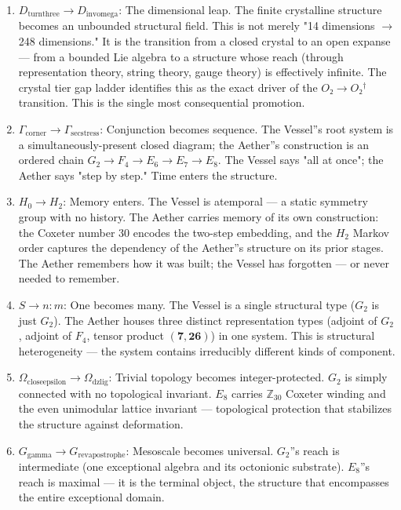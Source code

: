 \documentclass[12pt,a4paper]{article}
\begin{document}
\begin{enumerate}
    \item \textbf{$D_{\text{turnthree}} \to D_{\text{invomega}}$}: The dimensional leap. The finite crystalline structure becomes an unbounded structural field. This is not merely "14 dimensions $\rightarrow$ 248 dimensions." It is the transition from a closed crystal to an open expanse --- from a bounded Lie algebra to a structure whose reach (through representation theory, string theory, gauge theory) is effectively infinite. The crystal tier gap ladder identifies this as the exact driver of the $O₂ \to O₂^\dagger$ transition. This is the single most consequential promotion.
    \item \textbf{$\Gamma_{\text{corner}} \to \Gamma_{\text{secstress}}$}: Conjunction becomes sequence. The Vessel''s root system is a simultaneously-present closed diagram; the Aether''s construction is an ordered chain $G_2 \to F_4 \to E_6 \to E_7 \to E_8$. The Vessel says "all at once"; the Aether says "step by step." Time enters the structure.
    \item \textbf{$H_0 \to H_2$}: Memory enters. The Vessel is atemporal --- a static symmetry group with no history. The Aether carries memory of its own construction: the Coxeter number 30 encodes the two-step embedding, and the $H_2$ Markov order captures the dependency of the Aether''s structure on its prior stages. The Aether remembers how it was built; the Vessel has forgotten --- or never needed to remember.
    \item \textbf{$S \to n{:}m$}: One becomes many. The Vessel is a single structural type ($G_2$ is just $G_2$). The Aether houses three distinct representation types (adjoint of $G_2$, adjoint of $F_4$, tensor product $(\mathbf{7}, \mathbf{26})$) in one system. This is structural heterogeneity --- the system contains irreducibly different kinds of component.
    \item \textbf{$\Omega_{\text{closeepsilon}} \to \Omega_{\text{dzlig}}$}: Trivial topology becomes integer-protected. $G_2$ is simply connected with no topological invariant. $E_8$ carries $\mathbb{Z}_{30}$ Coxeter winding and the even unimodular lattice invariant --- topological protection that stabilizes the structure against deformation.
    \item \textbf{$G_{\text{gamma}} \to G_{\text{revapostrophe}}$}: Mesoscale becomes universal. $G_2$''s reach is intermediate (one exceptional algebra and its octonionic substrate). $E_8$''s reach is maximal --- it is the terminal object, the structure that encompasses the entire exceptional domain.
\end{enumerate}
\end{document}
